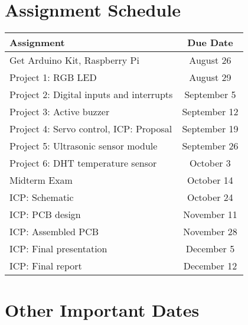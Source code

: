 \pagebreak

\section*{Assignment Schedule} 

\begin{table*}[h!]
    \begin{tabular}{ l | c }
        \toprule
        Assignment & Due Date \\

        \midrule
        Get Arduino Kit, Raspberry Pi\footnotemark              & August 26     \\
        Project 1: RGB LED                                      & August 29     \\
        Project 2: Digital inputs and interrupts                & September 5   \\
        Project 3: Active buzzer                                & September 12  \\
        Project 4: Servo control, ICP: Proposal\footnotemark[2] & September 19  \\
        Project 5: Ultrasonic sensor module                     & September 26  \\
        Project 6: DHT temperature sensor                       & October 3     \\
        Midterm Exam                                            & October 14    \\
        ICP: Schematic                                          & October 24    \\
        ICP: PCB design                                         & November 11   \\
        ICP: Assembled PCB                                      & November 28   \\
        ICP: Final presentation                                 & December 5    \\
        ICP: Final report                                       & December 12   \\

        \bottomrule
    \end{tabular}
\end{table*}

\section*{Other Important Dates}

